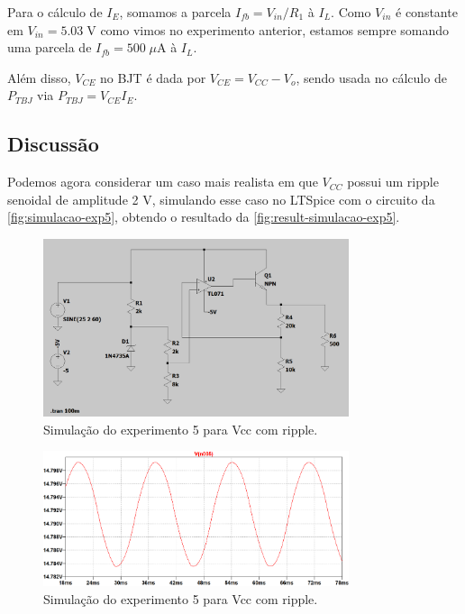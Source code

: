 \documentclass[
	12pt,				%
	oneside,			%
	a4paper,			%
	chapter=TITLE,
	sumario=tradicional,
	english,			%
	brazil				%
]{abntex2}
\newcommand{\un}[1]{\;\text{#1}}
\begin{document}
Para o cálculo de $I_E$, somamos a parcela $I_{fb} = V_{in} / R_1$ à $I_L$. Como
$V_{in}$ é constante em $V_{in} = 5.03 \un{V}$ como vimos no experimento anterior, 
estamos sempre somando uma parcela de $I_{fb} = 500 \un{$\mu$A}$ à $I_L$.

Além disso, $V_{CE}$ no BJT é dada por $V_{CE} = V_{CC} - V_o$, sendo usada no cálculo 
de $P_{TBJ}$ via $P_{TBJ} = V_{CE} I_E$. 

\subsection{Discussão}

Podemos agora considerar um caso mais realista em que $V_{CC}$ possui um ripple
senoidal de amplitude 2 V, simulando
esse caso no LTSpice com o circuito da \autoref{fig:simulacao-exp5},
obtendo o resultado da \autoref{fig:result-simulacao-exp5}.

\begin{figure}[h!]
	\caption{\label{fig:simulacao-exp5}Simulação do experimento 5 para Vcc com ripple.}
	\begin{center}
    \includegraphics[width=0.8\textwidth,trim=1 1 1 1,clip]{images/simulacao-exp5.png}
	\end{center}
\end{figure}

\begin{figure}[h!]
	\caption{\label{fig:result-simulacao-exp5}Simulação do experimento 5 para Vcc com ripple.}
	\begin{center}
    \includegraphics[width=0.8\textwidth,trim=1 1 1 1,clip]{images/result-simulacao-exp5.png}
	\end{center}
\end{figure}
\end{document}
